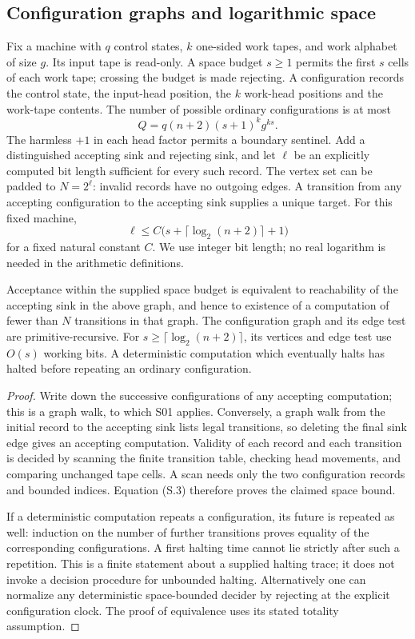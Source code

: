 \subsection{Configuration graphs and logarithmic space}

Fix a machine with $q$ control states, $k$ one-sided work tapes, and
work alphabet of size $g$.  Its input tape is read-only.  A space budget
$s\geq1$ permits the first $s$ cells of each work tape; crossing the
budget is made rejecting.  A configuration records the control state,
the input-head position, the $k$ work-head positions and the work-tape
contents.  The number of possible ordinary configurations is at most
\[
 Q=q(n+2)(s+1)^k g^{ks}.                 \tag{S.2}
\]
The harmless $+1$ in each head factor permits a boundary sentinel.
Add a distinguished accepting sink and rejecting sink, and let $\ell$
be an explicitly computed bit length sufficient for every such record.
The vertex set can be padded to $N=2^\ell$: invalid records have no
outgoing edges.  A transition from any accepting configuration to the
accepting sink supplies a unique target.  For this fixed machine,
\[
 \ell\leq C\bigl(s+\lceil\log_2(n+2)\rceil+1\bigr)
 \tag{S.3}
\]
for a fixed natural constant $C$.  We use integer bit length; no real
logarithm is needed in the arithmetic definitions.

\begin{theorem}
\label{thm:S02}
Acceptance within the supplied space budget is equivalent to reachability
of the accepting sink in the above graph, and hence to existence of a
computation of fewer than $N$ transitions in that graph.  The
configuration graph and its edge test are primitive-recursive.  For
$s\geq\lceil\log_2(n+2)\rceil$, its vertices and edge test use $O(s)$
working bits.  A deterministic computation which eventually halts has
halted before repeating an ordinary configuration.
\end{theorem}
\begin{proof}
Write down the successive configurations of any accepting computation;
this is a graph walk, to which S01 applies.  Conversely, a graph walk
from the initial record to the accepting sink lists legal transitions,
so deleting the final sink edge gives an accepting computation.  Validity
of each record and each transition is decided by scanning the finite
transition table, checking head movements, and comparing unchanged tape
cells.  A scan needs only the two configuration records and bounded
indices.  Equation (S.3) therefore proves the claimed space bound.

If a deterministic computation repeats a configuration, its future is
repeated as well: induction on the number of further transitions proves
equality of the corresponding configurations.  A first halting time
cannot lie strictly after such a repetition.  This is a finite statement
about a supplied halting trace; it does not invoke a decision procedure
for unbounded halting.  Alternatively one can normalize any deterministic
space-bounded decider by rejecting at the explicit configuration clock.
The proof of equivalence uses its stated totality assumption.
\end{proof}

